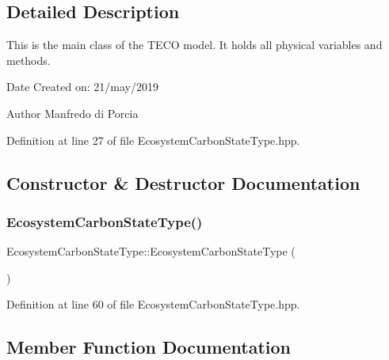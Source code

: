 \subsection{Detailed Description}
This is the main class of the T\+E\+CO model. It holds all physical variables and methods. 

\begin{DoxyDate}{Date}
Created on\+: 21/may/2019 
\end{DoxyDate}
\begin{DoxyAuthor}{Author}
Manfredo di Porcia 
\end{DoxyAuthor}


Definition at line 27 of file Ecosystem\+Carbon\+State\+Type.\+hpp.



\subsection{Constructor \& Destructor Documentation}
\mbox{\label{class_ecosystem_carbon_state_type_a88c8eda06ce5e4bd306220280718939a}} 
\subsubsection{\texorpdfstring{Ecosystem\+Carbon\+State\+Type()}{EcosystemCarbonStateType()}}
{\footnotesize\ttfamily Ecosystem\+Carbon\+State\+Type\+::\+Ecosystem\+Carbon\+State\+Type (\begin{DoxyParamCaption}{ }\end{DoxyParamCaption})\hspace{0.3cm}{\ttfamily [inline]}}



Definition at line 60 of file Ecosystem\+Carbon\+State\+Type.\+hpp.



\subsection{Member Function Documentation}
\mbox{\label{class_ecosystem_carbon_state_type_af3682294ea4888ea45404b675e184bd0}} 
